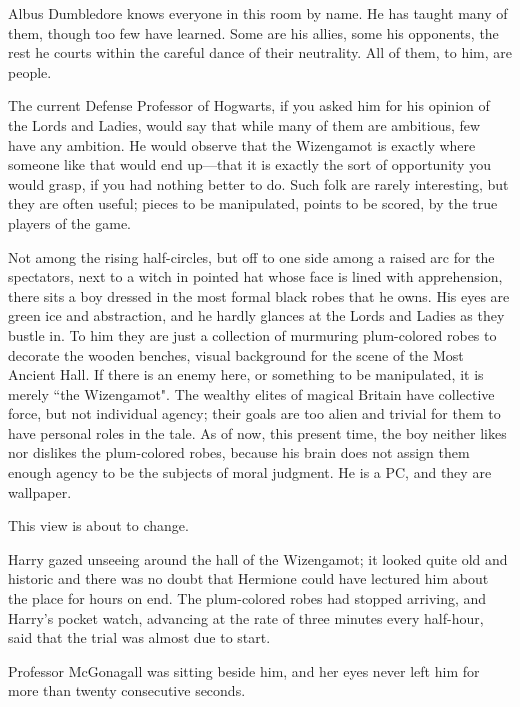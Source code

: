 Albus Dumbledore knows everyone in this room by name. He has taught many of them, though too few have learned. Some are his allies, some his opponents, the rest he courts within the careful dance of their neutrality. All of them, to him, are people.

The current Defense Professor of Hogwarts, if you asked him for his opinion of the Lords and Ladies, would say that while many of them are ambitious, few have any ambition. He would observe that the Wizengamot is exactly where someone like that would end up—that it is exactly the sort of opportunity you would grasp, if you had nothing better to do. Such folk are rarely interesting, but they are often useful; pieces to be manipulated, points to be scored, by the true players of the game.

Not among the rising half-circles, but off to one side among a raised arc for the spectators, next to a witch in pointed hat whose face is lined with apprehension, there sits a boy dressed in the most formal black robes that he owns. His eyes are green ice and abstraction, and he hardly glances at the Lords and Ladies as they bustle in. To him they are just a collection of murmuring plum-colored robes to decorate the wooden benches, visual background for the scene of the Most Ancient Hall. If there is an enemy here, or something to be manipulated, it is merely ``the Wizengamot". The wealthy elites of magical Britain have collective force, but not individual agency; their goals are too alien and trivial for them to have personal roles in the tale. As of now, this present time, the boy neither likes nor dislikes the plum-colored robes, because his brain does not assign them enough agency to be the subjects of moral judgment. He is a PC, and they are wallpaper.

This view is about to change.

\later

Harry gazed unseeing around the hall of the Wizengamot; it looked quite old and historic and there was no doubt that Hermione could have lectured him about the place for hours on end. The plum-colored robes had stopped arriving, and Harry's pocket watch, advancing at the rate of three minutes every half-hour, said that the trial was almost due to start.

Professor McGonagall was sitting beside him, and her eyes never left him for more than twenty consecutive seconds.

